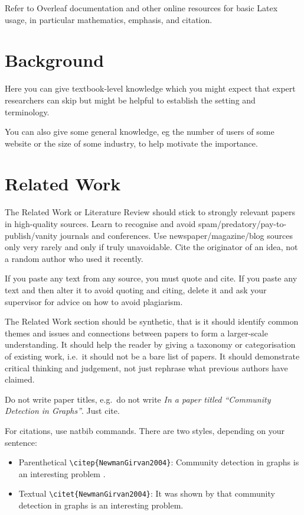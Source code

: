 \documentclass[oneside,12pt]{Classes/RoboticsLaTeX}
\begin{document}
Refer to Overleaf documentation and other online resources for basic Latex usage, in particular mathematics, emphasis, and citation.


\chapter{Background}
\label{chap:backg}

Here you can give textbook-level knowledge which you might expect that expert researchers can skip but might be helpful to establish the setting and terminology. 

You can also give some general knowledge, eg the number of users of some website or the size of some industry, to help motivate the importance.

\chapter{Related Work}
\label{chap:rel_work}

The Related Work or Literature Review should stick to strongly relevant papers in high-quality sources. Learn to recognise and avoid spam/predatory/pay-to-publish/vanity journals and conferences. Use newspaper/magazine/blog sources only very rarely and only if truly unavoidable. Cite the originator of an idea, not a random author who used it recently.

If you paste any text from any source, you must quote and cite. If you paste any text and then alter it to avoid quoting and citing, delete it and ask your supervisor for advice on how to avoid plagiarism.

The Related Work section should be synthetic, that is it should identify common themes and issues and connections between papers to form a larger-scale understanding. It should help the reader by giving a taxonomy or categorisation of existing work, i.e.~it should not be a bare list of papers. It should demonstrate critical thinking and judgement, not just rephrase what previous authors have claimed.

Do not write paper titles, e.g.~do not write {\em In a paper titled ``Community Detection in Graphs''}. Just cite.

For citations, use natbib commands. There are two styles, depending on your sentence:
\begin{itemize}
\item Parenthetical \verb+\citep{NewmanGirvan2004}+: Community detection in graphs is an interesting problem \citep{NewmanGirvan2004}.
\item Textual \verb+\citet{NewmanGirvan2004}+: It was shown by \citet{NewmanGirvan2004} that community detection in graphs is an interesting problem.
\end{itemize}
\end{document}
